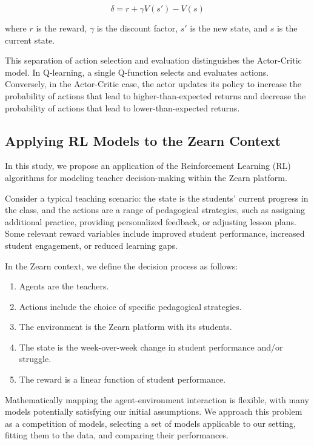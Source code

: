 \documentclass[
  number,
  preprint,
  3p,
  onecolumn]{elsarticle}
\begin{document}
\[
\delta = r + \gamma V(s') - V(s)
\]

where \(r\) is the reward, \(\gamma\) is the discount factor, \(s'\) is
the new state, and \(s\) is the current state.

This separation of action selection and evaluation distinguishes the
Actor-Critic model. In Q-learning, a single Q-function selects and
evaluates actions. Conversely, in the Actor-Critic case, the actor
updates its policy to increase the probability of actions that lead to
higher-than-expected returns and decrease the probability of actions
that lead to lower-than-expected returns.

\subsection{Applying RL Models to the Zearn
Context}\label{applying-rl-models-to-the-zearn-context}

In this study, we propose an application of the Reinforcement Learning
(RL) algorithms for modeling teacher decision-making within the Zearn
platform.

Consider a typical teaching scenario: the state is the students' current
progress in the class, and the actions are a range of pedagogical
strategies, such as assigning additional practice, providing
personalized feedback, or adjusting lesson plans. Some relevant reward
variables include improved student performance, increased student
engagement, or reduced learning gaps.

In the Zearn context, we define the decision process as follows:

\begin{enumerate}
\def\labelenumi{\arabic{enumi}.}
\item
  Agents are the teachers.
\item
  Actions include the choice of specific pedagogical strategies.
\item
  The environment is the Zearn platform with its students.
\item
  The state is the week-over-week change in student performance and/or
  struggle.
\item
  The reward is a linear function of student performance.
\end{enumerate}

Mathematically mapping the agent-environment interaction is flexible,
with many models potentially satisfying our initial assumptions. We
approach this problem as a competition of models, selecting a set of
models applicable to our setting, fitting them to the data, and
comparing their performances.
\end{document}
